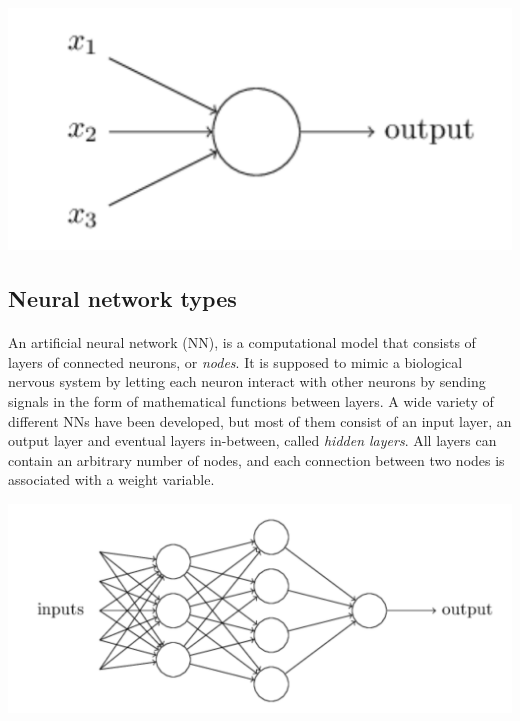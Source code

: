 \documentclass[%
oneside,                 %
final,                   %
10pt]{article}
\begin{document}
\vspace{6mm}

\centerline{\includegraphics[width=0.9\linewidth]{figures/perceptron.png}}

\vspace{6mm}




\subsection{Neural network types}

\paragraph{}
An artificial neural network (NN), is a computational model that consists of layers of connected neurons, or \emph{nodes}. 
It is supposed to mimic a biological nervous system by letting each neuron interact with other neurons
by sending signals in the form of mathematical functions between layers. 
A wide variety of different NNs have
been developed, but most of them consist of an input layer, an output layer and eventual layers in-between, called
\emph{hidden layers}. All layers can contain an arbitrary number of nodes, and each connection between two nodes
is associated with a weight variable. 



\vspace{6mm}

\centerline{\includegraphics[width=0.6\linewidth]{figures/dnn.png}}
\end{document}

